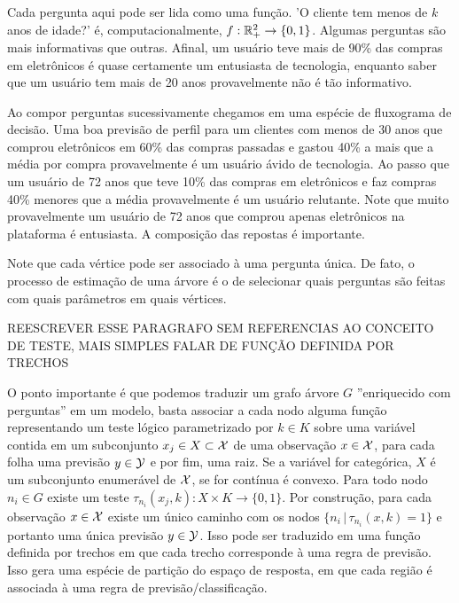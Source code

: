 \begin{exemplo}
Cada pergunta aqui pode ser lida como uma função. 'O cliente tem menos de $k$ anos de idade?' é, computacionalmente,  $f: \mathbb{R}^2_+ \to \{0, 1\}$. Algumas perguntas são mais informativas que outras. Afinal, um usuário teve mais de 90\% das compras em eletrônicos é quase certamente um entusiasta de tecnologia, enquanto saber que um usuário tem mais de 20 anos provavelmente não é tão informativo. 

Ao compor perguntas sucessivamente chegamos em uma espécie de fluxograma de decisão. Uma boa previsão de perfil para um clientes com menos de 30 anos que comprou eletrônicos em 60\% das compras passadas e gastou 40\% a mais que a média por compra provavelmente é um usuário ávido de tecnologia. Ao passo que um usuário de 72 anos que teve 10\% das compras em eletrônicos e faz compras 40\% menores que a média provavelmente é um usuário relutante. Note que muito provavelmente um usuário de 72 anos que comprou apenas eletrônicos na plataforma é entusiasta. A composição das repostas é importante.

Note que cada vértice pode ser associado à uma pergunta única. De fato, o processo de estimação de uma árvore é o de selecionar quais perguntas são feitas com quais parâmetros em quais vértices. 
\end{exemplo}

REESCREVER ESSE PARAGRAFO SEM REFERENCIAS AO CONCEITO DE TESTE, MAIS SIMPLES FALAR DE FUNÇÃO DEFINIDA POR TRECHOS

O ponto importante é que podemos traduzir um grafo árvore $G$ ''enriquecido com perguntas'' em um modelo, basta associar a cada nodo alguma função representando um teste lógico parametrizado por $k \in K$ sobre uma variável contida em um subconjunto $x_j \in X \subset \mathcal{X}$ de uma observação $x \in \mathcal{X}$, para cada folha uma previsão $y \in \mathcal{Y}$ e por fim, uma raiz. Se a variável for categórica, $X$ é um subconjunto enumerável de $\mathcal{X}$, se for contínua é convexo. Para todo nodo $n_i \in G$ existe um teste $\tau_{n_i}(x_j, k) : X  \times K \to \{0, 1\}$. Por construção, para cada observação $x \in \mathcal{X}$ existe um único caminho com os nodos $ \{n_i \, | \, \tau_{n_i}(x, k) = 1\}$ e portanto uma única previsão $y \in \mathcal{Y}$. Isso pode ser traduzido em uma função definida por trechos em que cada trecho corresponde à uma regra de previsão. Isso gera uma espécie de partição do espaço de resposta, em que cada região é associada à uma regra de previsão/classificação.


